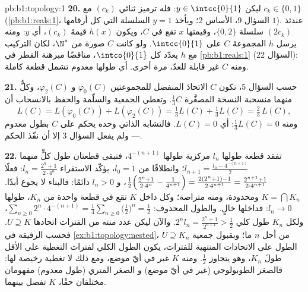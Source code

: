 \begin{solution}{pb:b1:topology:1}
\textbf{20.} ليكن $y \in \intcc{0}{1}$: فله ترميز ثنائي
$(c_k)$ مع $c_k \in \{0, 1\}$ (\cref{pb:b1:reals:1}، السؤال
9، الأساس $2$؛ ويأخذ $y = 1$ السلسلة التي كل أرقامها $1$). عندئذ $(2c_k)$
سلسلة $\{0,2\}$، وقيمتها $x$ تقع في $C$، ويكون $h(x)$
قيمةَ $(c_k)$، أي $y$: ومنه يرسل $h$ المجموعةَ $C$ على
$\intcc{0}{1}$. ولو كانت $C$ صورة  من $\N^*$،
لكان التركيب مع $h$ يعدّد كل $\intco{0}{1}$،
مناقضًا مبرهنة القطر في \cref{pb:b1:reals:1}
(السؤال 22): ومنه  $C$ غير قابلة للعدّ، مرة أخرى. أي  طولها معدوم
تشمل قطعة كاملة.

\textbf{21.} حسب السؤال 5، تكون $C$ الاتحادَ المنفصل للمجموعتين
$\varphi_0(C)$ و $\varphi_2(C)$، وكلٌّ منهما منسحبة النسخة
المصغَّرة $\frac13 C$. وتعطي الجمعية والسلّمة والحفظ
بالانسحاب أن
\[
L(C) = L(\varphi_0(C)) + L(\varphi_2(C))
= \tfrac13 L(C) + \tfrac13 L(C) = \tfrac23\,L(C),
\]
ومنه $\frac13 L(C) = 0$: أي $L(C) = 0$. فالتشابه الذاتي وحده
يحكم على $C$ بطول معدوم --- ولم يفعل السؤال 3 إلا أن نفّذ
الحكم.

\textbf{22.} تفقد قطعة طولها $l_n$  مركزية
طولها $4^{-(n+1)}$، فتبقى قطعتان طول كلٍّ منهما $l_{n+1}
= \frac{l_n - 4^{-(n+1)}}{2}$؛ وانطلاقًا من $l_0 = 1$، يؤكّد الاستقراء
$l_n = \frac{2^n + 1}{2\cdot4^n}$: فعلًا
$\frac12\Bigl(\frac{2^n+1}{2\cdot4^n} - \frac{1}{4^{n+1}}\Bigr)
= \frac{2(2^n + 1) - 1}{2\cdot4^{n+1}} = \frac{2^{n+1} +
1}{2\cdot4^{n+1}}$، و $l_n > 0$ دائمًا: فالبناء لا
يجوع أبدًا.  $K = \bigcap K_n$  ومحدودة، ومنه متراصة؛
وكل  داخل $K$ تقع في قطعة واحدة من $K_n$، طولها
$l_n \to 0$: فداخلها خالٍ. والطول المحذوف: $\sum_{n\geq0} 2^n
\cdot 4^{-(n+1)} = \frac14\sum_{n\geq0}\bigl(\frac12\bigr)^n =
\frac12$، ولكل $K_n$ طول كلي $2^n l_n = \frac{2^n +
1}{2^{n+1}} > \frac12$. والآن ليكن عدد منته من الفترات 
اتحادها $U \supseteq K$. فحسب  الرفيقة في
\cref{ex:b1:topology:nested}، $U \supseteq K_n$ من أجل $n$ ما؛
وبقبول جمعية الطول على الاتحادات المنتهية للفترات،
يكون الطول الكلي لفترات التغطية على الأقل طولَ
$K_n$، وهو يتجاوز $\frac12$. ومنه  $K$ غير  في أيّ موضع، ومع ذلك لا
تغطية رخيصة لها: فالصغر الطوبولوجي (غير  في أيّ موضع) و
الصغر المتري (طول معدوم) مفهومان مختلفان حقًا،
 $K$ تفصل بينهما.


\end{solution}
